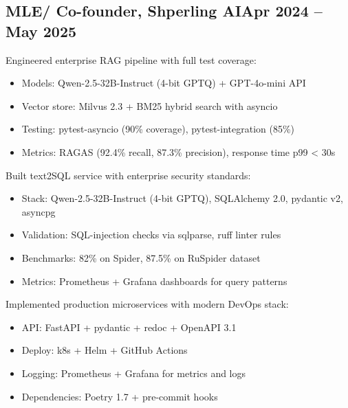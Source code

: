 \documentclass[a4paper,12pt]{article}
\begin{document}


\subsection{{MLE/ Co-founder, Shperling AI}\hfill Apr 2024 -- May 2025}
\begin{zitemize}
\item Engineered enterprise RAG pipeline with full test coverage:
    \begin{itemize}
        \item Models: Qwen-2.5-32B-Instruct (4-bit GPTQ) + GPT-4o-mini API
        \item Vector store: Milvus 2.3 + BM25 hybrid search with asyncio
        \item Testing: pytest-asyncio (90\% coverage), pytest-integration (85\%)
        \item Metrics: RAGAS (92.4\% recall, 87.3\% precision), response time p99 < 30s
    \end{itemize}
\item Built text2SQL service with enterprise security standards:
    \begin{itemize}
        \item Stack: Qwen-2.5-32B-Instruct (4-bit GPTQ), SQLAlchemy 2.0, pydantic v2, asyncpg
        \item Validation: SQL-injection checks via sqlparse, ruff linter rules
        \item Benchmarks: 82\% on Spider, 87.5\% on RuSpider dataset
        \item Metrics: Prometheus + Grafana dashboards for query patterns
    \end{itemize}
\item Implemented production microservices with modern DevOps stack:
    \begin{itemize}
        \item API: FastAPI + pydantic + redoc + OpenAPI 3.1
        \item Deploy: k8s + Helm + GitHub Actions
        \item Logging: Prometheus + Grafana for metrics and logs
        \item Dependencies: Poetry 1.7 + pre-commit hooks
    \end{itemize}
\end{zitemize}
\end{document}
